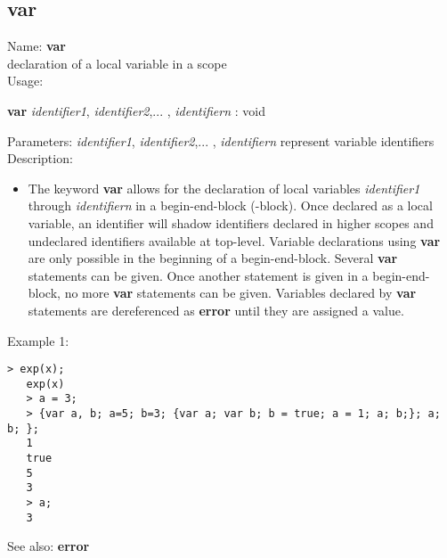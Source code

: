 \subsection{ var }
\noindent Name: \textbf{var}\\
declaration of a local variable in a scope\\

\noindent Usage: 
\begin{center}
\textbf{var} \emph{identifier1}, \emph{identifier2},... , \emph{identifiern} : \textsf{void}\\
\end{center}
Parameters: 
\emph{identifier1}, \emph{identifier2},... , \emph{identifiern} represent variable identifiers\\

\noindent Description: \begin{itemize}

\item The keyword \textbf{var} allows for the declaration of local variables
   \emph{identifier1} through \emph{identifiern} in a begin-end-block ({}-block).
   Once declared as a local variable, an identifier will shadow
   identifiers declared in higher scopes and undeclared identifiers
   available at top-level.
   Variable declarations using \textbf{var} are only possible in the
   beginning of a begin-end-block. Several \textbf{var} statements can be
   given. Once another statement is given in a begin-end-block, no more
   \textbf{var} statements can be given.
   Variables declared by \textbf{var} statements are dereferenced as \textbf{error}
   until they are assigned a value. 
\end{itemize}
\noindent Example 1: 
\begin{center}\begin{minipage}{14.8cm}\begin{Verbatim}[frame=single]
   > exp(x); 
   exp(x)
   > a = 3; 
   > {var a, b; a=5; b=3; {var a; var b; b = true; a = 1; a; b;}; a; b; }; 
   1
   true
   5
   3
   > a;
   3
\end{Verbatim}
\end{minipage}\end{center}
See also: \textbf{error}
